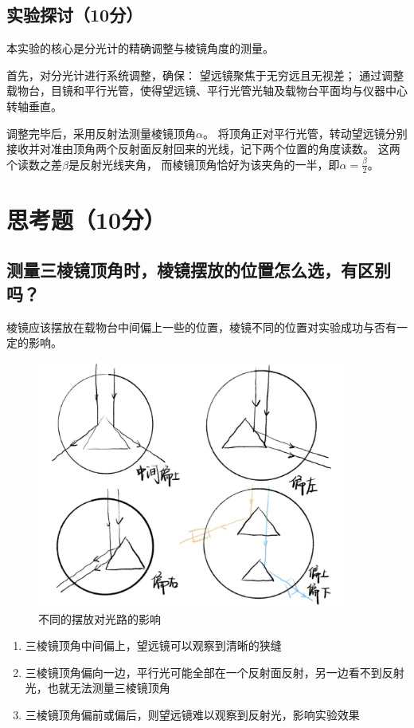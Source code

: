 \documentclass{../template/Report}%
\begin{document}
\subsection{实验探讨（10分）}
本实验的核心是分光计的精确调整与棱镜角度的测量。

首先，对分光计进行系统调整，确保：
望远镜聚焦于无穷远且无视差；
通过调整载物台，目镜和平行光管，使得望远镜、平行光管光轴及载物台平面均与仪器中心转轴垂直。

调整完毕后，采用反射法测量棱镜顶角$\alpha$。
将顶角正对平行光管，转动望远镜分别接收并对准由顶角两个反射面反射回来的光线，记下两个位置的角度读数。
这两个读数之差$\beta$是反射光线夹角，
而棱镜顶角恰好为该夹角的一半，即$\alpha = \frac{\beta}{2}$。
\section{思考题（10分）}
\subsection{测量三棱镜顶角时，棱镜摆放的位置怎么选，有区别吗？}
棱镜应该摆放在载物台中间偏上一些的位置，棱镜不同的位置对实验成功与否有一定的影响。
\begin{figure}[H]
\centering
\includegraphics[width=0.9\textwidth]{./figures/思考1.jpg}
\caption{不同的摆放对光路的影响}
\end{figure}
\begin{enumerate}
  \item 三棱镜顶角中间偏上，望远镜可以观察到清晰的狭缝
  \item 三棱镜顶角偏向一边，平行光可能全部在一个反射面反射，另一边看不到反射光，也就无法测量三棱镜顶角
  \item 三棱镜顶角偏前或偏后，则望远镜难以观察到反射光，影响实验效果
\end{enumerate}
\end{document}
